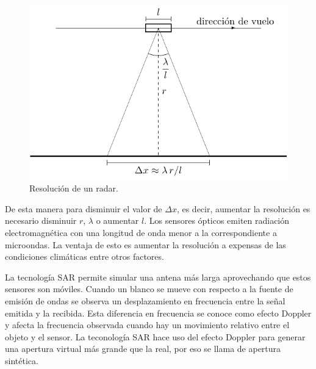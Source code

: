 \begin{figure}[hbt]
	\centering    
	\includegraphics[scale=1]{../../Figures/Tesis/Capitulo3/Resolucion.pdf}
	\caption{\label{Resolucion}Resolución de un radar.}
\end{figure} 

De esta manera para disminuir el valor de $\Delta x$, es decir, aumentar la resolución es necesario disminuir $r$, $\lambda$ o aumentar $l$. 
Los sensores ópticos emiten radiación electromagnética con una longitud de onda menor a la correspondiente a microondas. 
La ventaja de esto es aumentar la resolución a expensas de las condiciones climáticas entre otros factores.

La tecnología SAR permite simular una antena más larga aprovechando que estos sensores son móviles. 
Cuando un blanco se mueve con respecto a la fuente de emisión de ondas se observa un desplazamiento en frecuencia entre la señal emitida y la recibida. Esta diferencia en frecuencia se conoce como efecto Doppler y afecta la frecuencia observada cuando hay un movimiento relativo entre el objeto y el sensor. La teconología SAR hace uso del efecto Doppler para generar una apertura virtual más grande que la real, por eso se llama de apertura sintética.

